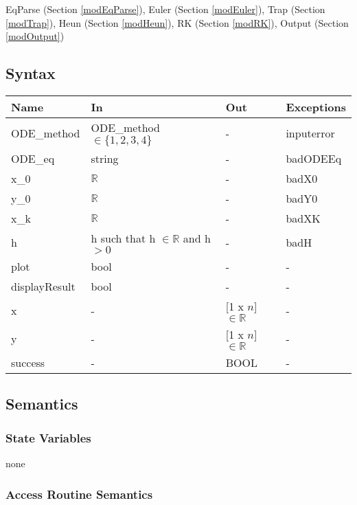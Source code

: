 \documentclass[12pt, titlepage]{article}
\begin{document}
EqParse (Section \ref{modEqParse}), Euler (Section \ref{modEuler}), Trap (Section \ref{modTrap}),
Heun (Section \ref{modHeun}), RK (Section \ref{modRK}), Output (Section \ref{modOutput})

\subsection{Syntax}

\begin{center}
\begin{tabular}{p{4cm} p{4cm} p{4cm} p{2cm}}
\hline
\textbf{Name} & \textbf{In} & \textbf{Out} & \textbf{Exceptions} \\
\hline
ODE\_method & ODE\_method $\in \{1, 2, 3, 4\}$  & - &  inputerror\\
ODE\_eq & string & - & badODEEq\\
x\_0 & $\mathbb{R}$ & - & badX0\\
y\_0 & $\mathbb{R}$ & - & badY0\\
x\_k & $\mathbb{R}$ & - & badXK\\
h & h such that h $\in \mathbb{R}$ and h $> 0$ & - & badH\\
plot & bool & - & - \\
displayResult & bool & - & - \\
x & - & [1 x $n$] $\in \mathbb{R}$ & - \\
y & - & [1 x $n$] $\in \mathbb{R}$ & - \\
success & - & BOOL & - \\
\hline
\end{tabular}
\end{center}


\subsection{Semantics}

\subsubsection{State Variables}
none

\newpage

\subsubsection{Access Routine Semantics}
\end{document}
